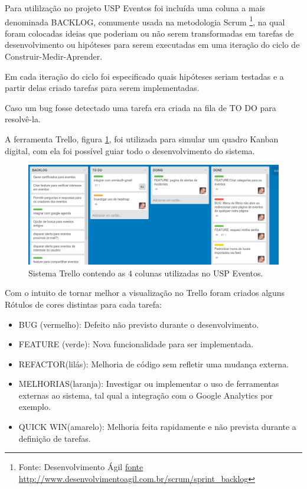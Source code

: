 \par Para utililzação no projeto USP Eventos foi incluída uma coluna a mais denominada BACKLOG, comumente usada na metodologia Scrum \footnote{Fonte: Desenvolvimento Ágil \url{fonte http://www.desenvolvimentoagil.com.br/scrum/sprint_backlog}}, na qual foram colocadas ideias que poderiam ou não serem transformadas em tarefas de desenvolvimento ou hipóteses para serem executadas em uma iteração do ciclo de Construir-Medir-Aprender.
\par Em cada iteração do ciclo foi especificado quais hipóteses seriam testadas e a partir delas criado tarefas para serem implementadas.
\par Caso um bug fosse detectado uma tarefa era criada na fila de TO DO para resolvê-la.
\par A ferramenta Trello, figura \ref{fig:kanban}, foi utilizada para simular um quadro Kanban digital, com ela foi possível guiar todo o desenvolvimento do sistema.
\begin{figure}[htb]
\includegraphics[width=15cm]{figuras/kanban}
\caption{\label{fig:kanban} Sistema Trello contendo as 4 colunas utilizadas no USP Eventos.}
\end{figure}
        Com o intuito de tornar melhor a visualização no Trello foram criados alguns Rótulos de cores distintas para cada tarefa:
        \begin{itemize}
        \item BUG (vermelho): Defeito não previsto durante o desenvolvimento.
        \item FEATURE (verde): Nova funcionalidade para ser implementada.
        \item REFACTOR(lilás):  Melhoria de código sem refletir uma mudança externa.
        \item MELHORIAS(laranja): Investigar ou implementar o uso de ferramentas externas ao sistema, tal qual a integração com o Google Analytics por exemplo.
        \item QUICK WIN(amarelo): Melhoria feita rapidamente e não prevista durante a definição de tarefas.
        \end{itemize}
